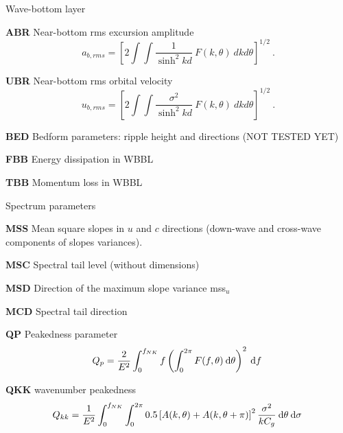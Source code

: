 \begin{list}{)\hfill}
\item{Wave-bottom layer}

\begin{list}{)\hfill}
            { \leftmargin 8mm 
             \rightmargin 0mm \itemsep 0mm \parsep 0mm}

\item \textbf{ABR} Near-bottom rms excursion amplitude
      \begin{equation} a_{b,rms} = \left [ 2 \int \!\!\!\! \int
      \frac{1}{\sinh^2 kd} \: F(k,\theta) \: dk d\theta \right ] ^{1/2}
      \: . \label{eq:ab_rms} \end{equation}
\item \textbf{UBR} Near-bottom rms orbital velocity
      \begin{equation} u_{b,rms} = \left [ 2 \int \!\!\!\! \int
      \frac{\sigma^2}{\sinh^2 kd} \: F(k,\theta) \: dk d\theta \right ] ^{1/2}
      \: . \label{eq:ub_rms} \end{equation}
\item \textbf{BED} Bedform parameters: ripple height and directions (NOT TESTED YET)   
\item \textbf{FBB} Energy dissipation in WBBL 
\item \textbf{TBB} Momentum loss in WBBL 
\end{list}

\item{Spectrum parameters}

\begin{list}{)\hfill}
            { \leftmargin 8mm 
             \rightmargin 0mm \itemsep 0mm \parsep 0mm}

\item \textbf{MSS} Mean square slopes in $u$ and $c$ directions (down-wave and cross-wave components of slopes variances). 
\item \textbf{MSC} Spectral tail level (without dimensions) 
\item \textbf{MSD} Direction of the maximum slope variance mss$_u$
\item \textbf{MCD} Spectral tail direction
\item \textbf{QP}  Peakedness parameter \citep{art:G70}
      \begin{equation} Q_p = \frac{2}{E^2} \int_0^{f_{NK}} f \left( \int_0^{2\pi} 
      F(f,\theta) \:{\mathrm d} \theta \right)^2 \: {\mathrm d}  f \: \label{eq:qp}
      \end{equation}
\item \textbf{QKK}  wavenumber peakedness \citep{art:DC23}
      \begin{equation} Q_{kk} = \frac{1}{E^2} \int_0^{f_{NK}} \int_0^{2\pi} 
      0.5 \left[ A(k,\theta)+ A(k,\theta+\pi)\right]^2 \frac{\sigma^2}{k C_g} \:{\mathrm d} \theta  \: {\mathrm d}  \sigma \: \label{eq:qkk}
      \end{equation}
\end{list}


\end{list}
